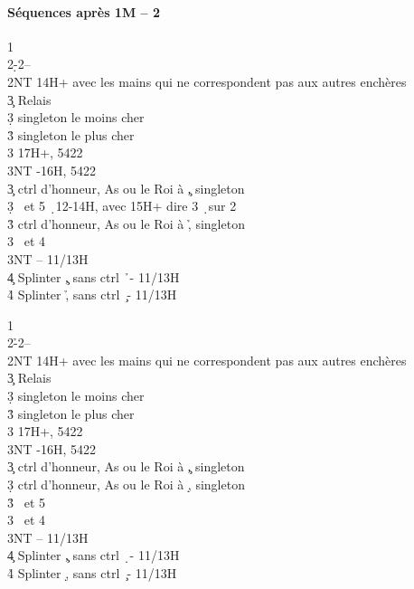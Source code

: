 \documentclass[a4paper]{article}
\begin{document}
\paragraph{Séquences après 1M – 2 \pdfc}

\begin{bidtable}
1\c\\
2\d-2\s--\\
2NT \> 14H+ avec les mains qui ne correspondent pas aux autres enchères\+\\
3\c \> Relais\+\\
3\d \> singleton le moins cher\\
3\h \> singleton le plus cher\\
3\s \> 17H+, 5422\\
3NT -16H, 5422\-\-\\
3\c \> ctrl d’honneur, As ou le Roi à \c , singleton \h \\
3\d {} \s\ et 5 \d\ 12-14H, avec 15H+ dire 3 \d\ sur 2 \c \\
3\h \> ctrl d’honneur, As ou le Roi à \h , singleton \c \\
3\s {} \s\ et 4 \d \\
3NT  – 11/13H\\
4\c \> Splinter \c , sans ctrl \h\ - 11/13H\\
4\h \> Splinter \h , sans ctrl \c\ - 11/13H
\end{bidtable}

\begin{bidtable}
1\c\\
2\h-2\s--\\
2NT \> 14H+ avec les mains qui ne correspondent pas aux autres enchères\+\\
3\c \> Relais\+\\
3\d \> singleton le moins cher\\
3\h \> singleton le plus cher\\
3\s \> 17H+, 5422\\
3NT -16H, 5422\-\-\\
3\c \> ctrl d’honneur, As ou le Roi à \c , singleton \d \\
3\d \> ctrl d’honneur, As ou le Roi à \d , singleton \c \\
3\h {} \s\ et 5 \h \\
3\s {} \s\ et 4 \h \\
3NT  – 11/13H\\
4\c \> Splinter \c , sans ctrl \d\ - 11/13H\\
4\h \> Splinter \d , sans ctrl \c\ - 11/13H
\end{bidtable}
\end{document}
